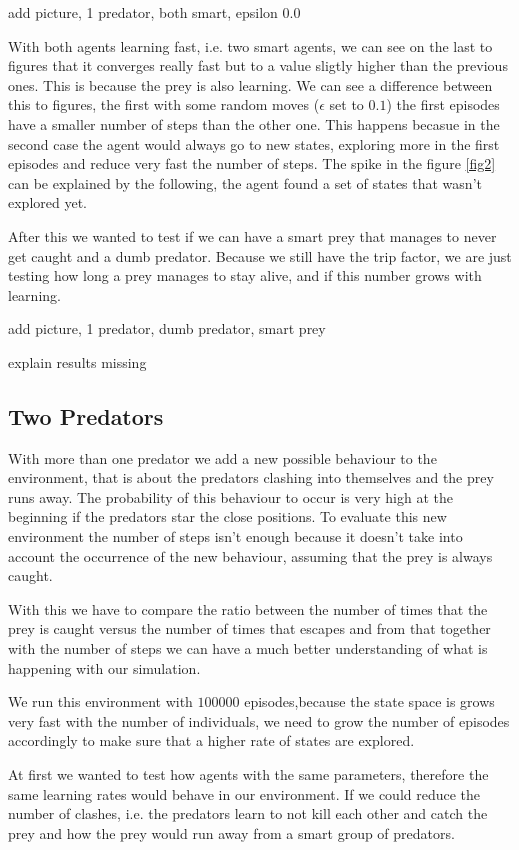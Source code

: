\documentclass{article}
\begin{document}
\error add picture, 1 predator, both smart, epsilon 0.0

With both agents learning fast, i.e. two smart agents, we can see on the last to
figures that it converges really fast but to a value sligtly higher than the
previous ones. This is because the prey is also learning.
We can see a difference between this to figures, the first with some random
moves ($\epsilon$ set to $0.1$) the first episodes have a smaller number of
steps than the other one. This happens becasue in the second case the agent
would always go to new states, exploring more in the first episodes and reduce
very fast the number of steps.
The spike in the figure \ref{fig2} can be explained by the following, the agent
found a set of states that wasn't explored yet.

After this we wanted to test if we can have a smart prey that manages to never
get caught and a dumb predator. Because we still have the trip
factor, we are just testing how long a prey manages to stay alive, and if this
number grows with learning.

\error add picture, 1 predator, dumb predator, smart prey

\error explain results missing


\subsection{Two Predators}
\label{twoP}
With more than one predator we add a new possible behaviour to the environment,
that is about the predators clashing into themselves and the prey runs away. The
probability of this behaviour to occur is very high at the beginning if the
predators star the close positions. To evaluate this new environment the number
of steps isn't enough because it doesn't take into account the occurrence of the
new behaviour, assuming that the prey is always caught. 

With this we have to compare the ratio between the number of times that the prey
is caught versus the number of times that escapes and from that together
with the number of steps we can have a much better understanding of what is
happening with our simulation.

We run this environment with $100000$ episodes,because the state space is grows
very fast with the number of individuals, we need to grow the number of episodes
accordingly to make sure that a higher rate of states are explored.

At first we wanted to test how agents with the same parameters, therefore
the same learning rates would behave in our environment. If we could reduce the
number of clashes, i.e. the predators learn to not kill each other and catch the
prey and how the prey would run away from a smart group of predators.
\end{document}
